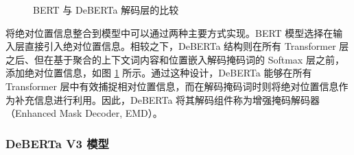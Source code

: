 \begin{figure}[htbp]
\centering  
{}
\hfill
{}

\caption{BERT 与 DeBERTa 解码层的比较 \cite{he_deberta_2021}}
\label{fig:emd}
\end{figure}

将绝对位置信息整合到模型中可以通过两种主要方式实现。BERT 模型选择在输入层直接引入绝对位置信息。相较之下，DeBERTa 结构则在所有 Transformer 层之后、但在基于聚合的上下文词内容和位置嵌入解码掩码词的 Softmax 层之前，添加绝对位置信息，如图 \ref{fig:emd} 所示。通过这种设计，DeBERTa 能够在所有 Transformer 层中有效捕捉相对位置信息，而在解码掩码词时则将绝对位置信息作为补充信息进行利用。因此，DeBERTa 将其解码组件称为增强掩码解码器（Enhanced Mask Decoder, EMD）。

\subsubsection{DeBERTa V3 模型}

